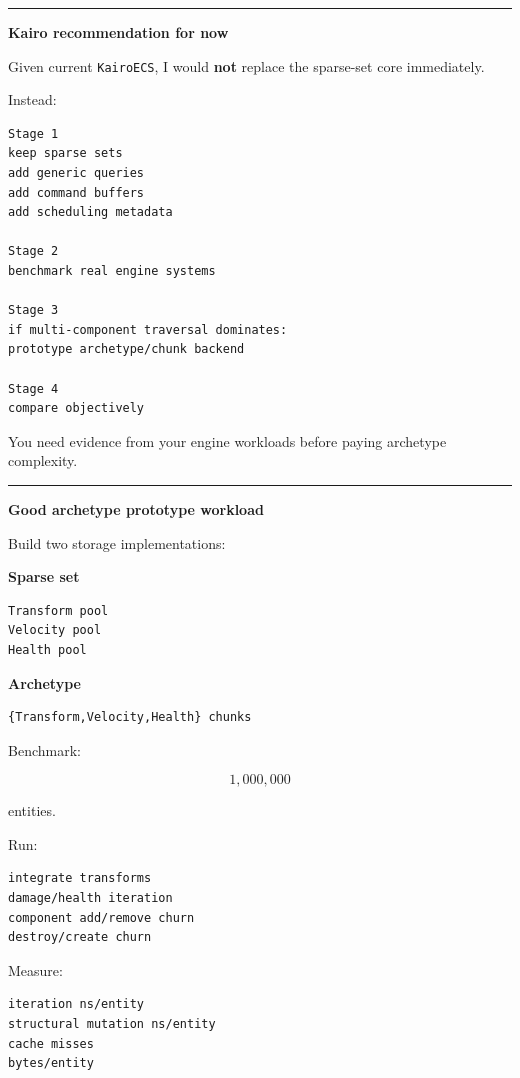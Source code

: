 \begin{center}\rule{0.5\linewidth}{0.5pt}\end{center}

\textbf{Kairo recommendation for now}

Given current \texttt{KairoECS}, I would \textbf{not} replace the sparse-set core immediately.

Instead:

\begin{verbatim}
Stage 1
keep sparse sets
add generic queries
add command buffers
add scheduling metadata

Stage 2
benchmark real engine systems

Stage 3
if multi-component traversal dominates:
prototype archetype/chunk backend

Stage 4
compare objectively
\end{verbatim}

You need evidence from your engine workloads before paying archetype complexity.

\begin{center}\rule{0.5\linewidth}{0.5pt}\end{center}

\textbf{Good archetype prototype workload}

Build two storage implementations:

\textbf{Sparse set}

\begin{verbatim}
Transform pool
Velocity pool
Health pool
\end{verbatim}

\textbf{Archetype}

\begin{verbatim}
{Transform,Velocity,Health} chunks
\end{verbatim}

Benchmark:

\[
1,000,000
\]

entities.

Run:

\begin{verbatim}
integrate transforms
damage/health iteration
component add/remove churn
destroy/create churn
\end{verbatim}

Measure:

\begin{verbatim}
iteration ns/entity
structural mutation ns/entity
cache misses
bytes/entity
\end{verbatim}

